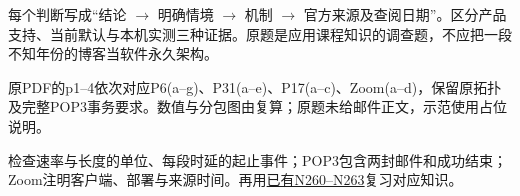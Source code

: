 

每个判断写成“结论 \ensuremath{\to} 明确情境 \ensuremath{\to} 机制 \ensuremath{\to} 官方来源及查阅日期”。区分产品支持、当前默认与本机实测三种证据。原题是应用课程知识的调查题，不应把一段不知年份的博客当软件永久架构。





原PDF的p1–4依次对应P6(a–g)、P31(a–e)、P17(a–c)、Zoom(a–d)，保留原拓扑及完整POP3事务要求。数值与分包图由复算；原题未给邮件正文，示范使用占位说明。


检查速率与长度的单位、每段时延的起止事件；POP3包含两封邮件和成功结束；Zoom注明客户端、部署与来源时间。再用\href{https://crazyshout.github.io/micro-course/cards.html\#CS5222-N260}{已有N260–N263}复习对应知识。
\endgroup
